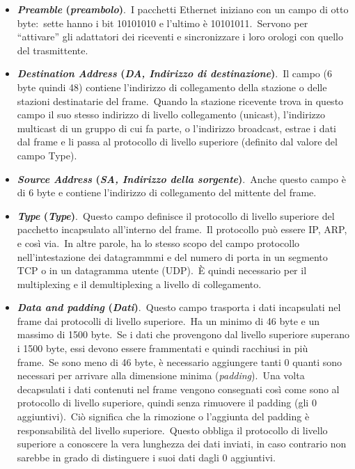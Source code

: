 \begin{itemize}
    \item \textbf{\emph{Preamble} (\emph{preambolo})}.\
          I pacchetti Ethernet iniziano con un campo di otto byte:\ sette hanno i bit 10101010 e l’ultimo è 10101011.\
          Servono per ``attivare'' gli adattatori dei riceventi e sincronizzare i loro orologi con quello del trasmittente.
    \item \textbf{\emph{Destination Address} (\emph{DA, Indirizzo di destinazione})}.\
          Il campo (6 byte quindi 48) contiene l'indirizzo di collegamento della stazione o delle stazioni destinatarie del frame.\
          Quando la stazione ricevente trova in questo campo il suo stesso indirizzo di livello collegamento (unicast), l'indirizzo multicast di un gruppo di cui fa parte, o l'indirizzo broadcast, estrae i dati dal frame e li passa al protocollo di livello superiore (definito dal valore del campo Type).
    \item \textbf{\emph{Source Address} (\emph{SA, Indirizzo della sorgente})}.\
          Anche questo campo è di 6 byte e contiene l'indirizzo di collegamento del mittente del frame.
    \item \textbf{\emph{Type} (\emph{Type})}.\
          Questo campo definisce il protocollo di livello superiore del pacchetto incapsulato all'interno del frame.\
          Il protocollo può essere IP, ARP, e così via.\
          In altre parole, ha lo stesso scopo del campo protocollo nell'intestazione dei datagrammmi e del numero di porta in un segmento TCP o in un datagramma utente (UDP).\
          È quindi necessario per il multiplexing e il demultiplexing a livello di collegamento.
    \item \textbf{\emph{Data and padding} (\emph{Dati})}.\
          Questo campo trasporta i dati incapsulati nel frame dai protocolli di livello superiore.\
          Ha un minimo di 46 byte e un massimo di 1500 byte.\
          Se i dati che provengono dal livello superiore superano i 1500 byte, essi devono essere frammentati e quindi racchiusi in più frame.\
          Se sono meno di 46 byte, è necessario aggiungere tanti 0 quanti sono necessari per arrivare alla dimensione minima (\emph{padding}).\
          Una volta decapsulati i dati contenuti nel frame vengono consegnati così come sono al protocollo di livello superiore, quindi senza rimuovere il padding (gli 0 aggiuntivi).\
          Ciò significa che la rimozione o l'aggiunta del padding è responsabilità del livello superiore.\
          Questo obbliga il protocollo di livello superiore a conoscere la vera lunghezza dei dati inviati, in caso contrario non sarebbe in grado di distinguere i suoi dati dagli 0 aggiuntivi.\

\end{itemize}
